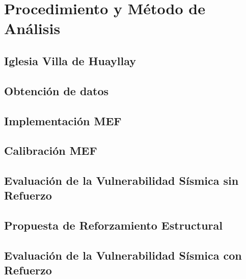 \section{Procedimiento y Método de Análisis}

\subsection{Iglesia Villa de Huayllay}
  
\subsection{Obtención de datos}

\subsection{Implementación MEF}

\subsection{Calibración MEF}

\subsection{Evaluación de la Vulnerabilidad Sísmica sin Refuerzo}

\subsection{Propuesta de Reforzamiento Estructural}

\subsection{Evaluación de la Vulnerabilidad Sísmica con Refuerzo}